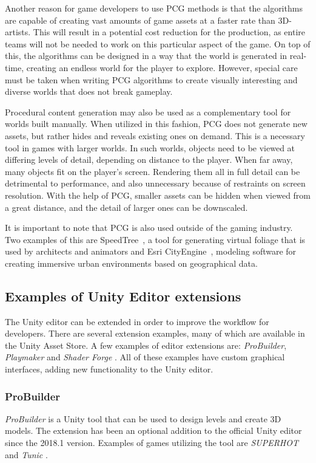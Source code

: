 Another reason for game developers to use PCG methods is that the algorithms are capable of creating vast amounts of game assets at a faster rate than 3D-artists. This will result in a potential cost reduction for the production, as entire teams will not be needed to work on this particular aspect of the game. On top of this, the algorithms can be designed in a way that the world is generated in real-time, creating an endless world for the player to explore. However, special care must be taken when writing PCG algorithms to create visually interesting and diverse worlds that does not break gameplay.

Procedural content generation may also be used as a complementary tool for worlds built manually. When utilized in this fashion, PCG does not generate new assets, but rather hides and reveals existing ones on demand. This is a necessary tool in games with larger worlds. In such worlds, objects need to be viewed at differing levels of detail, depending on distance to the player. When far away, many objects fit on the player's screen. Rendering them all in full detail can be detrimental to performance, and also unnecessary because of restraints on screen resolution. With the help of PCG, smaller assets can be hidden when viewed from a great distance, and the detail of larger ones can be downscaled. \cite[p. 57]{shaker2016procedural}

It is important to note that PCG is also used outside of the gaming industry. Two examples of this are SpeedTree~\cite{SpeedTree}, a tool for generating virtual foliage that is used by architects and animators and Esri CityEngine~\cite{CityEngine}, modeling software for creating immersive urban environments based on geographical data.

\subsection{Examples of Unity Editor extensions}
The Unity editor can be extended in order to improve the workflow for developers. There are several extension examples, many of which are available in the Unity Asset Store. A few examples of editor extensions are: \textit{ProBuilder}, \textit{Playmaker} and \textit{Shader Forge} \cite{unity-probuilder, unity-hutong-playmaker, unity-shadow-forge}. All of these examples have custom graphical interfaces, adding new functionality to the Unity editor.

\subsubsection{ProBuilder}
\textit{ProBuilder} is a Unity tool that can be used to design levels and create 3D models. The extension has been an optional addition to the official Unity editor since the 2018.1 version. Examples of games utilizing the tool are \textit{SUPERHOT} and \textit{Tunic} \cite{unity-probuilder}.

